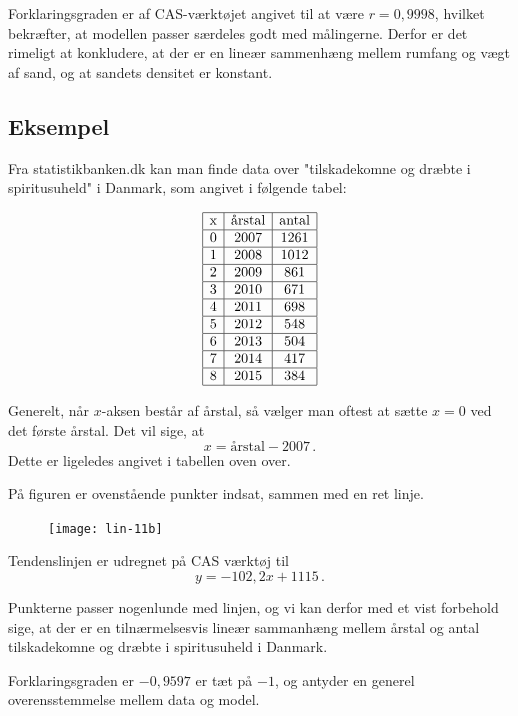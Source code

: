 \documentclass[12pt,oneside,a4paper]{article}
\begin{document}
Forklaringsgraden er af CAS-værktøjet angivet til at være $r=0,9998$, hvilket bekræfter, at modellen
passer særdeles godt med målingerne. Derfor er det rimeligt at konkludere, at der er en 
lineær sammenhæng mellem rumfang og vægt af sand, og at sandets densitet er konstant.

\subsection{Eksempel}
Fra statistikbanken.dk kan man finde data over "tilskadekomne og dræbte i spiritusuheld" i Danmark, som
angivet i følgende tabel:

\[
\begin{array}{|c|c|c|}
    \hline
    $x$ & \mbox{årstal} & \mbox{antal} \\
    \hline
    0 & 2007 & 1261 \\
    \hline
    1 & 2008 & 1012 \\
    \hline
    2 & 2009 & 861 \\
    \hline
    3 & 2010 & 671 \\
    \hline
    4 & 2011 & 698 \\
    \hline
    5 & 2012 & 548 \\
    \hline
    6 & 2013 & 504 \\
    \hline
    7 & 2014 & 417 \\
    \hline
    8 & 2015 & 384 \\
    \hline
\end{array}
\]

Generelt, når $x$-aksen består af årstal, så vælger man oftest at sætte $x=0$ ved det første årstal.
Det vil sige, at
\[
    x = \mbox{årstal} - 2007\,.
\]
Dette er ligeledes angivet i tabellen oven over.

På figuren er ovenstående punkter indsat, sammen med en ret linje.

\begin{figure}[H]
    \centering
    \texttt{[image: lin-11b]}
\end{figure}

Tendenslinjen er udregnet på CAS værktøj til
\[
    y=-102,2x+1115 \,.
\]

Punkterne passer nogenlunde med linjen, og vi kan derfor med et vist forbehold
sige, at der er en tilnærmelsesvis lineær sammanhæng mellem årstal og antal
tilskadekomne og dræbte i spiritusuheld i Danmark.

Forklaringsgraden er $-0,9597$ er tæt på $-1$, og antyder en generel overensstemmelse mellem
data og model.
\end{document}
